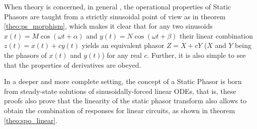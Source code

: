 	When theory is concerned, in general , the operational properties of Static Phasors are taught from a strictly sinusoidal point of view as in theorem \ref{theo:ps_morphism}, which makes it clear that for any two sinusoids $x(t) = M\cos\left(\omega t + \alpha\right)$  and $y(t) = N\cos\left(\omega t + \beta\right)$ their linear combination $z(t) = x(t) + cy(t)$ yields an equivalent phasor $Z = X + cY$ ($X$ and $Y$ being the phasors of $x(t)$ and $y(t)$) for any real $c$. Further, it is also simple to see that the properties of derivatives are obeyed.

	In a deeper and more complete setting, the concept of a Static Phasor is born from steady-state solutions of sinusoidally-forced linear ODEs, that is, these proofs also prove that the linearity of the static phasor transform also allows to obtain the combination of responses for linear circuits, as shown in theorem \ref{theo:spo_linear}.

